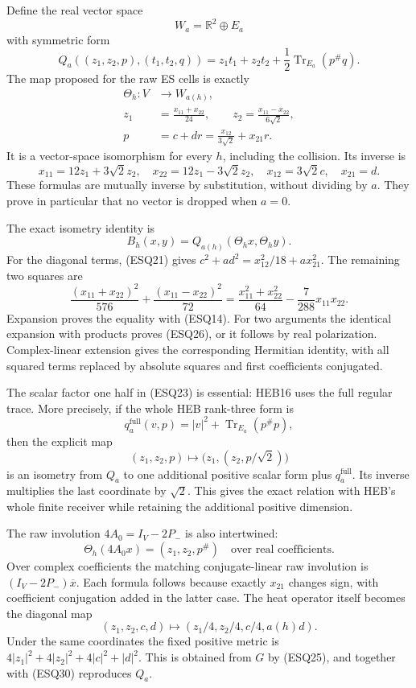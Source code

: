 \documentclass[
  10pt,
  a4paper,
]{article}
\begin{document}
Define the real vector space \[
W_a=\mathbb R^2\oplus E_a
\tag{ESQ22}
\] with symmetric form \[
Q_a((z_1,z_2,p),(t_1,t_2,q))
=z_1t_1+z_2t_2+\frac12\operatorname{Tr}_{E_a}(p^\#q).
\tag{ESQ23}
\] The map proposed for the raw ES cells is exactly \[
\begin{aligned}
\Theta_h:V&\longrightarrow W_{a(h)},\\
z_1&=\frac{x_{11}+x_{22}}{24},\qquad
z_2=\frac{x_{11}-x_{22}}{6\sqrt2},\\
p&=c+dr=\frac{x_{12}}{3\sqrt2}+x_{21}r.
\end{aligned}
\tag{ESQ24}
\] It is a vector-space isomorphism for every \(h\), including the
collision. Its inverse is \[
x_{11}=12z_1+3\sqrt2z_2,\quad
x_{22}=12z_1-3\sqrt2z_2,\quad
x_{12}=3\sqrt2c,\quad x_{21}=d.
\tag{ESQ25}
\] These formulas are mutually inverse by substitution, without dividing
by \(a\). They prove in particular that no vector is dropped when
\(a=0\).

The exact isometry identity is \[
B_h(x,y)=Q_{a(h)}(\Theta_hx,\Theta_hy).
\tag{ESQ26}
\] For the diagonal terms, (ESQ21) gives
\(c^2+a d^2=x_{12}^2/18+a x_{21}^2\). The remaining two squares are \[
\frac{(x_{11}+x_{22})^2}{576}
+\frac{(x_{11}-x_{22})^2}{72}
=\frac{x_{11}^2+x_{22}^2}{64}-\frac7{288}x_{11}x_{22}.
\tag{ESQ27}
\] Expansion proves the equality with (ESQ14). For two arguments the
identical expansion with products proves (ESQ26), or it follows by real
polarization. Complex-linear extension gives the corresponding Hermitian
identity, with all squared terms replaced by absolute squares and first
coefficients conjugated.

The scalar factor one half in (ESQ23) is essential: HEB16 uses the full
regular trace. More precisely, if the whole HEB rank-three form is \[
q_a^{\mathrm{full}}(v,p)=|v|^2+\operatorname{Tr}_{E_a}(p^\#p),
\] then the explicit map \[
(z_1,z_2,p)\longmapsto\bigl(z_1,(z_2,p/\sqrt2)\bigr)
\tag{ESQ28}
\] is an isometry from \(Q_a\) to one additional positive scalar form
plus \(q_a^{\mathrm{full}}\). Its inverse multiplies the last coordinate
by \(\sqrt2\). This gives the exact relation with HEB's whole finite
receiver while retaining the additional positive dimension.

The raw involution \(4A_0=I_V-2P_-\) is also intertwined: \[
\Theta_h(4A_0x)=(z_1,z_2,p^\#)
\quad\text{over real coefficients}.
\tag{ESQ29}
\] Over complex coefficients the matching conjugate-linear raw
involution is \((I_V-2P_-)\overline x\). Each formula follows because
exactly \(x_{21}\) changes sign, with coefficient conjugation added in
the latter case. The heat operator itself becomes the diagonal map \[
(z_1,z_2,c,d)\longmapsto(z_1/4,z_2/4,c/4,a(h)d).
\tag{ESQ30}
\] Under the same coordinates the fixed positive metric is
\(4|z_1|^2+4|z_2|^2+4|c|^2+|d|^2\). This is obtained from \(G\) by
(ESQ25), and together with (ESQ30) reproduces \(Q_a\).
\end{document}
